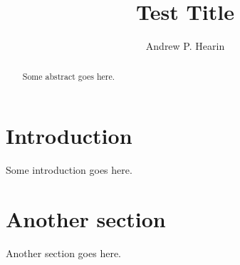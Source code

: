 \documentclass[usenatbib,usegraphicx,letterpaper]{mn2e}
\begin{document}
\title[Abridged Title]
{Test Title}

\author[A.P. Hearin]{Andrew P. Hearin}

\maketitle

\begin{abstract}
Some abstract goes here.
\end{abstract}

\section{Introduction}
Some introduction goes here.

\section{Another section}
Another section goes here. 



\end{document}
